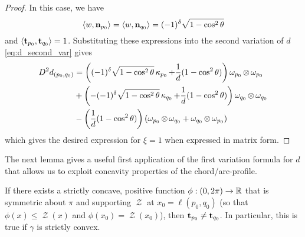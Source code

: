 \documentclass[11pt]{amsart}
\DeclareMathOperator{\chordarcprofile}{\mathcal{Z}}
\begin{document}
\begin{proof}
In this case, we have 
\[
\langle{w},{\operatorname{\mathbf{n}}_{p_0}}\rangle = \langle{w},{\operatorname{\mathbf{n}}_{q_0}}\rangle = (-1)^\delta \sqrt{1-\cos^2\theta}
\]
and $\langle{\operatorname{\mathbf{t}}_{p_0}},{\operatorname{\mathbf{t}}_{q_0}}\rangle = 1$. Substituting these expressions into the second variation of $d$ \eqref{eq:d_second_var} gives
\begin{align*}
D^2d_{(p_0,q_0)} &=  \left((-1)^{\delta} \sqrt{1-\cos^2\theta}\operatorname{\kappa}_{p_0} + \frac{1}{d}(1 - \cos^2\theta) \right) \omega_{p_0} \operatorname{\otimes} \omega_{p_0} \\
&+ \left(-(-1)^{\delta} \sqrt{1-\cos^2\theta} \operatorname{\kappa}_{q_0} + \frac{1}{d}(1 - \cos^2\theta) \right) \omega_{q_0} \operatorname{\otimes} \omega_{q_0} \\
&- \left(\frac{1}{d}(1 - \cos^2\theta) \right) \left(\omega_{p_0} \operatorname{\otimes} \omega_{q_0} + \omega_{q_0} \operatorname{\otimes} \omega_{p_0} \right)
\end{align*}
which gives the desired expression for $\xi=1$ when expressed in matrix form.

\end{proof}

The next lemma gives a useful first application of the first variation formula for \(d\) that allows us to exploit concavity properties of the chord/arc-profile. 

\begin{lemma}
\label{lem:concave_barrier}
If there exists a strictly concave, positive function $\phi: (0, 2\pi) \to \mathbb{R}$ that is symmetric about $\pi$ and supporting $\chordarcprofile$ at $x_0=\ell(p_0,q_0)$ (so that $\phi(x) \leq \chordarcprofile(x)$ and $\phi(x_0)=\chordarcprofile(x_0)$), then $\operatorname{\mathbf{t}}_{p_0} \ne \operatorname{\mathbf{t}}_{q_0}$. In particular, this is true if $\gamma$ is strictly convex.
\end{lemma}
\end{document}
